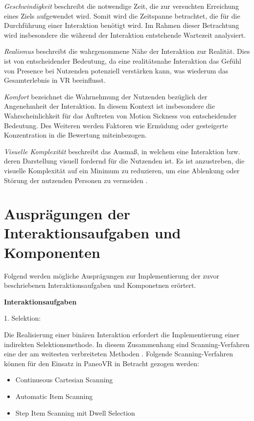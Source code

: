 \textit{Geschwindigkeit} beschreibt die notwendige Zeit, die zur versuchten Erreichung eines Ziels aufgewendet wird. Somit wird die Zeitspanne betrachtet, die für die Durchführung einer Interaktion benötigt wird. Im Rahmen dieser Betrachtung wird insbesondere die während der Interaktion entstehende Wartezeit analysiert. 

\textit{Realismus} beschreibt die wahrgenommene Nähe der Interaktion zur Realität. Dies ist von entscheidender Bedeutung, da eine realitätsnahe Interaktion das Gefühl von Presence bei Nutzenden potenziell verstärken kann, was wiederum das Gesamterlebnis in VR beeinflusst.  

\textit{Komfort} bezeichnet die Wahrnehmung der Nutzenden bezüglich der Angenehmheit der Interaktion. In diesem Kontext ist insbesondere die Wahrscheinlichkeit für das Auftreten von Motion Sickness von entscheidender Bedeutung. Des Weiteren werden Faktoren wie Ermüdung oder gesteigerte Konzentration in die Bewertung miteinbezogen.

\textit{Visuelle Komplexität} beschreibt das Ausmaß, in welchem eine Interaktion bzw. deren Darstellung visuell fordernd für die Nutzenden ist. Es ist anzustreben, die visuelle Komplexität auf ein Minimum zu reduzieren, um eine Ablenkung oder Störung der nutzenden Personen zu vermeiden \citep{steriadis_designing_2003}. 

\section{Ausprägungen der Interaktionsaufgaben und Komponenten}

Folgend werden mögliche Ausprägungen zur Implementierung der zuvor beschriebenen Interaktionsaufgaben und Komponetnen erörtert.

{\normalfont \bfseries Interaktionsaufgaben}  

1. Selektion: 

Die Realisierung einer binären Interaktion erfordert die Implementierung einer indirekten Selektionsmethode. In diesem Zusammenhang sind Scanning-Verfahren eine der am weitesten verbreiteten Methoden \citep{cook_chapter_2015}. Folgende Scanning-Verfahren können für den Einsatz in PaneoVR in Betracht gezogen werden: 

\begin{itemize}
    \item Continueous Cartesian Scanning 
    \item Automatic Item Scanning
    \item Step Item Scanning mit Dwell Selection 
\end{itemize}

